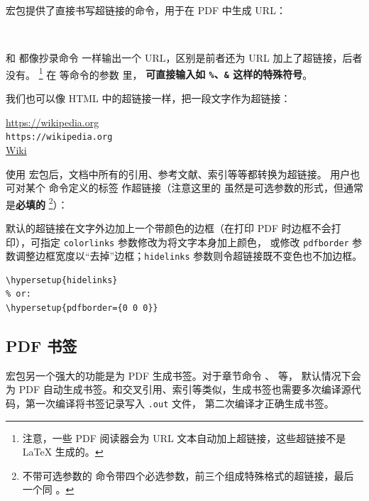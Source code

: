  宏包提供了直接书写超链接的命令，用于在 PDF 中生成 URL：
\begin{command}
 \\
\end{command}

 和  都像抄录命令  一样输出一个 URL，区别是前者还为 URL 加上了超链接，后者没有。%
\footnote{注意，一些 PDF 阅读器会为 URL 文本自动加上超链接，这些超链接不是 \LaTeX{} 生成的。}%
在  等命令的参数  里，
\textbf{可直接输入如 \texttt\%、\texttt\& 这样的特殊符号}。

我们也可以像 HTML 中的超链接一样，把一段文字作为超链接：
\begin{command}
\end{command}

\begin{example}
\url{https://wikipedia.org} \\
\nolinkurl{https://wikipedia.org} \\
\href{https://wikipedia.org}{Wiki}
\end{example}

使用  宏包后，文档中所有的引用、参考文献、索引等等都转换为超链接。
用户也可对某个  命令定义的标签  作超链接（注意这里的  虽然是可选参数的形式，但通常是\textbf{必填的}%
\footnote{不带可选参数的  命令带四个必选参数，前三个组成特殊格式的超链接，最后一个同 。}）：
\begin{command}
\end{command}

默认的超链接在文字外边加上一个带颜色的边框（在打印 PDF 时边框不会打印），可指定 \texttt{color\-links} 参数修改为将文字本身加上颜色，
或修改 \texttt{pdf\-border} 参数调整边框宽度以“去掉”边框；\texttt{hide\-links} 参数则令超链接既不变色也不加边框。
\begin{verbatim}
\hypersetup{hidelinks}
% or:
\hypersetup{pdfborder={0 0 0}}
\end{verbatim}

\subsection{PDF 书签}\label{subsec:pdf-bookmark}

 宏包另一个强大的功能是为 PDF 生成书签。对于章节命令 、 等，
默认情况下会为 PDF 自动生成书签。和交叉引用、索引等类似，生成书签也需要多次编译源代码，第一次编译将书签记录写入 \texttt{.out} 文件，
第二次编译才正确生成书签。

